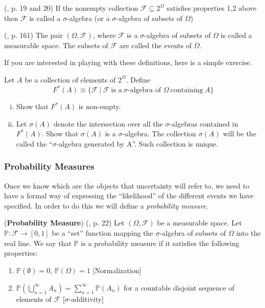 \documentclass[11pt]{article} %
\begin{document}
\begin{definition} (\cite{Billingsley95}, p. 19 and 20)
	If the nonempty collection $\mathcal{F} \subseteq 2^{\Omega}$ satisfies properties 1,2 above then $\mathcal{F}$ is called a $\sigma$-algebra (or a $\sigma$-algebra of subsets of $\Omega$)  
\end{definition}

\begin{definition} (\cite{Billingsley95}, p. 161)
	The pair $(\Omega, \mathcal{F})$, where $\mathcal{F}$ is a $\sigma$-algebra of subsets of $\Omega$ is called a measurable space. The subsets of $\mathcal{F}$ are called the events of $\Omega$.
\end{definition}

\noindent If you are interested in playing with these definitions, here is a simple exercise. \\

\begin{prproblem}[Optional]
Let $A$ be a collection of elements of $2^\Omega$. Define 
$$F^*(A) \equiv \{\mathcal{F} \: | \: \mathcal{F} \: \text{is a} \: \sigma\text{-algebra of } \Omega \: \text{containing} \: A\} $$

\begin{enumerate}[i)]
\item Show that $F^*(A)$ is non-empty. 
\item Let $\sigma(A)$ denote the intersection over all the $\sigma$-algebras contained in $F^*(A)$. Show that $\sigma(A)$ is a $\sigma$-algebra. The collection $\sigma(A)$ will be the called the ``$\sigma$-algebra generated by A''. Such collection is unique.
\end{enumerate}
\end{prproblem}

\subsubsection{Probability Measures}

Once we know which are the objects that uncertainty will refer to, we need to have a formal way of expressing the ``likelihood'' of the different events we have specified. In order to do this we will define a \emph{probability measure}. 

\begin{definition} (\textbf{Probability Measure}) (\cite{Billingsley95}, p. 22) Let $(\Omega, \mathcal{F})$ be a measurable space. Let $\mathbb{P}: \mathcal{F} \rightarrow [0,1]$ be a ``set'' function mapping the $\sigma$-algebra of subsets of $\Omega$ into the real line. We say that $\mathbb{P}$ is a probability measure if it satisfies the following properties:
\begin{enumerate}
	\item $\mathbb{P}(\emptyset)=0$, $\mathbb{P}(\Omega)=1$ [Normalization]
	\item $\mathbb{P}(\bigcup_{n=1}^{\infty} A_n)= \sum_{n=1}^{\infty} \mathbb{P}(A_n)$ for a countable disjoint sequence of elements of $\mathcal{F}$ [$\sigma$-additivity]\\
\end{enumerate}
\end{definition}
\end{document}
